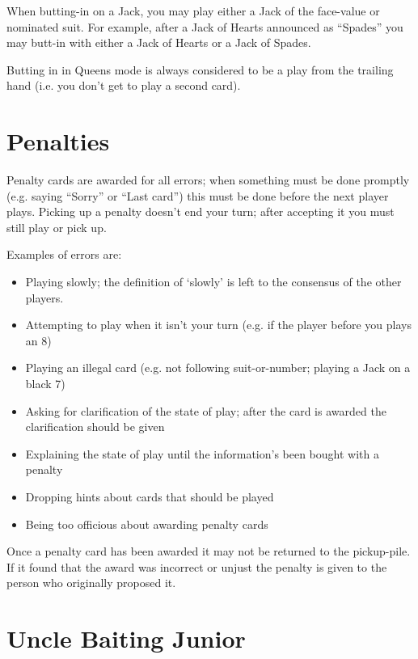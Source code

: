 \documentclass[12pt]{article}
\begin{document}
When butting-in on a Jack, you may play either a Jack of the face-value or nominated suit. For
example, after a Jack of Hearts announced as ``Spades'' you may butt-in with either
a Jack of Hearts or a Jack of Spades.

Butting in in Queens mode is always considered to be a play from the trailing hand (i.e. you
don't get to play a second card).

\section{Penalties}
\label{penalties}

Penalty cards are awarded for all errors;  when something must be done promptly (e.g. saying ``Sorry'' or
``Last card'') this must be done before the next player plays.  Picking up a penalty doesn't
end your turn;  after accepting it you must still play or pick up.

Examples of errors are:

\begin{itemize}
  \item Playing slowly;  the definition of `slowly' is left to the consensus of the other players.

  \item Attempting to play when it isn't your turn (e.g. if the player before you plays an 8)

  \item Playing an illegal card (e.g. not following suit-or-number;  playing a Jack on a black 7)

  \item Asking for clarification of the state of play;  after the card is awarded the
    clarification should be given

  \item Explaining the state of play until the information's been bought with a penalty

  \item Dropping hints about cards that should be played

  \item Being too officious about awarding penalty cards
\end{itemize}

Once a penalty card has been awarded it may not be returned to the pickup-pile.  If it found that the award was
incorrect or unjust the penalty is given to the person who originally proposed it.

\section{Uncle Baiting Junior}
\label{Junior}
\end{document}
